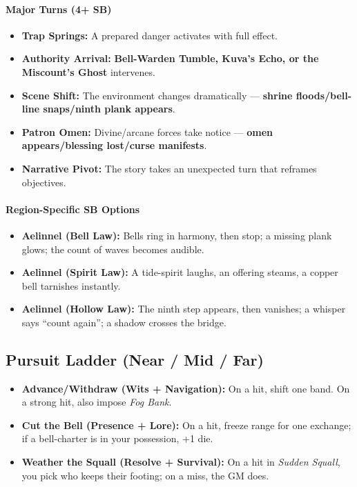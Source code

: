 \paragraph{Major Turns (4+ SB)}
\begin{itemize}
\item \textbf{Trap Springs:} A prepared danger activates with full effect.
\item \textbf{Authority Arrival:} \textbf{Bell-Warden Tumble, Kuva's Echo, or the Miscount's Ghost} intervenes.
\item \textbf{Scene Shift:} The environment changes dramatically --- \textbf{shrine floods/bell-line snaps/ninth plank appears}.
\item \textbf{Patron Omen:} Divine/arcane forces take notice --- \textbf{omen appears/blessing lost/curse manifests}.
\item \textbf{Narrative Pivot:} The story takes an unexpected turn that reframes objectives.
\end{itemize}

\paragraph{Region-Specific SB Options}
\begin{itemize}
\item \textbf{Aelinnel (Bell Law):} Bells ring in harmony, then stop; a missing plank glows; the count of waves becomes audible.
\item \textbf{Aelinnel (Spirit Law):} A tide-spirit laughs, an offering steams, a copper bell tarnishes instantly.
\item \textbf{Aelinnel (Hollow Law):} The ninth step appears, then vanishes; a whisper says ``count again''; a shadow crosses the bridge.
\end{itemize}

\subsection*{Pursuit Ladder (Near / Mid / Far)}
\begin{itemize}
\item \textbf{Advance/Withdraw (Wits + Navigation):} On a hit, shift one band. On a strong hit, also impose \emph{Fog Bank}.
\item \textbf{Cut the Bell (Presence + Lore):} On a hit, freeze range for one exchange; if a bell-charter is in your possession, +1 die.
\item \textbf{Weather the Squall (Resolve + Survival):} On a hit in \emph{Sudden Squall}, you pick who keeps their footing; on a miss, the GM does.
\end{itemize}

